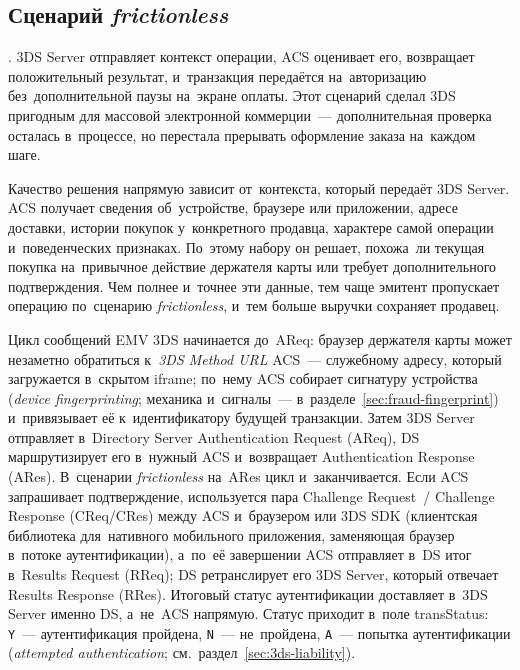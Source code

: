 \subsection*{Сценарий \textit{frictionless}}

. 3DS Server отправляет контекст операции,
ACS оценивает его, возвращает положительный результат, и~транзакция передаётся
на~авторизацию без~дополнительной паузы на~экране оплаты. Этот сценарий сделал 3DS
пригодным для массовой электронной коммерции~--- дополнительная проверка
осталась в~процессе, но перестала прерывать оформление заказа на~каждом шаге.

Качество решения напрямую зависит от~контекста, который передаёт 3DS
Server. ACS получает сведения об~устройстве, браузере или приложении, адресе
доставки, истории покупок у~конкретного продавца, характере самой операции
и~поведенческих признаках. По~этому набору он решает, похожа~ли текущая покупка
на~привычное действие держателя карты или требует дополнительного
подтверждения. Чем полнее и~точнее эти данные, тем чаще эмитент пропускает
операцию по~сценарию \textit{frictionless}, и~тем больше выручки сохраняет продавец.

Цикл сообщений EMV 3DS начинается до~AReq: браузер держателя карты может
незаметно обратиться к~\textit{3DS Method URL} ACS~--- служебному адресу,
который загружается в~скрытом iframe; по~нему ACS собирает
сигнатуру устройства (\textit{device fingerprinting}; механика и~сигналы~---
в~разделе~\ref{sec:fraud-fingerprint}) и~привязывает её к~идентификатору
будущей транзакции. Затем 3DS Server отправляет в~Directory Server
Authentication Request (AReq), DS маршрутизирует его в~нужный ACS и~возвращает
Authentication Response (ARes). В~сценарии \textit{frictionless} на~ARes цикл
и~заканчивается. Если ACS запрашивает подтверждение, используется пара
Challenge Request~/ Challenge Response (CReq/CRes) между ACS и~браузером или
3DS SDK (клиентская библиотека для~нативного мобильного приложения, заменяющая
браузер в~потоке аутентификации), а~по~её завершении ACS отправляет в~DS итог
в~Results Request (RReq); DS ретранслирует его 3DS Server, который отвечает
Results Response (RRes). Итоговый статус аутентификации доставляет в~3DS Server
именно DS, а~не~ACS напрямую. Статус приходит в~поле transStatus:
\texttt{Y}~--- аутентификация пройдена, \texttt{N}~--- не~пройдена,
\texttt{A}~--- попытка аутентификации (\textit{attempted authentication}; см.~раздел~\ref{sec:3ds-liability}).

